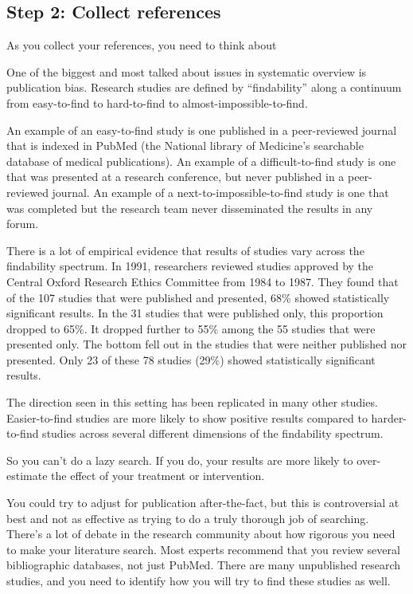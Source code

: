 \documentclass[
  letterpaper,
  DIV=11,
  numbers=noendperiod]{scrreprt}
\begin{document}
\begin{tcolorbox}
\section{Step 2: Collect references}\label{step-2-collect-references}

As you collect your references, you need to think about

One of the biggest and most talked about issues in systematic overview
is publication bias. Research studies are defined by ``findability''
along a continuum from easy-to-find to hard-to-find to
almost-impossible-to-find.

An example of an easy-to-find study is one published in a peer-reviewed
journal that is indexed in PubMed (the National library of Medicine's
searchable database of medical publications). An example of a
difficult-to-find study is one that was presented at a research
conference, but never published in a peer-reviewed journal. An example
of a next-to-impossible-to-find study is one that was completed but the
research team never disseminated the results in any forum.

There is a lot of empirical evidence that results of studies vary across
the findability spectrum. In 1991, researchers reviewed studies approved
by the Central Oxford Research Ethics Committee from 1984 to 1987. They
found that of the 107 studies that were published and presented, 68\%
showed statistically significant results. In the 31 studies that were
published only, this proportion dropped to 65\%. It dropped further to
55\% among the 55 studies that were presented only. The bottom fell out
in the studies that were neither published nor presented. Only 23 of
these 78 studies (29\%) showed statistically significant results.

The direction seen in this setting has been replicated in many other
studies. Easier-to-find studies are more likely to show positive results
compared to harder-to-find studies across several different dimensions
of the findability spectrum.

So you can't do a lazy search. If you do, your results are more likely
to over-estimate the effect of your treatment or intervention.

You could try to adjust for publication after-the-fact, but this is
controversial at best and not as effective as trying to do a truly
thorough job of searching. There's a lot of debate in the research
community about how rigorous you need to make your literature search.
Most experts recommend that you review several bibliographic databases,
not just PubMed. There are many unpublished research studies, and you
need to identify how you will try to find these studies as well.


\end{tcolorbox}
\end{document}
